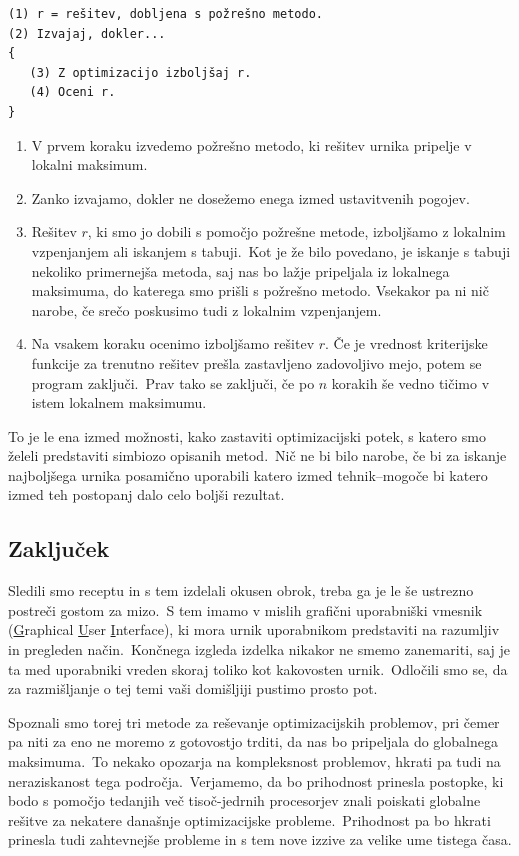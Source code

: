 \documentclass[a4paper,10pt]{article}
\begin{document}
\begin{verbatim}
(1) r = rešitev, dobljena s požrešno metodo.
(2) Izvajaj, dokler...
{
   (3) Z optimizacijo izboljšaj r.
   (4) Oceni r.
}
\end{verbatim}
\begin{enumerate}
   \item V prvem koraku izvedemo požrešno metodo, ki rešitev urnika pripelje v lokalni maksimum.

   \item Zanko izvajamo, dokler ne dosežemo enega izmed ustavitvenih pogojev.

   \item Rešitev \(r\), ki smo jo dobili s pomočjo požrešne metode, izboljšamo z lokalnim vzpenjanjem
   ali iskanjem s tabuji.\ Kot je že bilo povedano, je iskanje s tabuji nekoliko primernejša metoda,
   saj nas bo lažje pripeljala iz lokalnega maksimuma, do katerega smo prišli s požrešno metodo.
   Vsekakor pa ni nič narobe, če srečo poskusimo tudi z lokalnim vzpenjanjem.

   \item Na vsakem koraku ocenimo izboljšamo rešitev \(r\). Če je vrednost kriterijske funkcije
   za trenutno rešitev prešla zastavljeno zadovoljivo mejo, potem se program zaključi.\ Prav tako
   se zaključi, če po \(n\) korakih še vedno tičimo v istem lokalnem maksimumu.
\end{enumerate}   
\noindent To je le ena izmed možnosti, kako zastaviti optimizacijski potek, s katero smo želeli predstaviti
simbiozo opisanih metod.\ Nič ne bi bilo narobe, če bi za iskanje najboljšega urnika posamično
uporabili katero izmed tehnik--mogoče bi katero izmed teh postopanj dalo celo boljši rezultat.

\subsection{Zaključek}

Sledili smo receptu in s tem izdelali \frqq{}okusen obrok\flqq{}, treba ga je le še ustrezno postreči
gostom za mizo.\ S tem imamo v mislih grafični uporabniški vmesnik (\underline{G}raphical \underline{U}ser \underline{I}nterface), ki mora urnik uporabnikom predstaviti na razumljiv in
pregleden način.\ Končnega izgleda izdelka nikakor ne smemo zanemariti, saj je ta med uporabniki
vreden skoraj toliko kot kakovosten urnik.\ Odločili smo se, da za razmišljanje o tej temi vaši
domišljiji pustimo prosto pot.

Spoznali smo torej tri metode za reševanje optimizacijskih problemov, pri čemer pa niti za eno
ne moremo z gotovostjo trditi, da nas bo pripeljala do globalnega maksimuma.\ To nekako opozarja
na kompleksnost problemov, hkrati pa tudi na neraziskanost tega področja.\ Verjamemo, da bo
prihodnost prinesla postopke, ki bodo s pomočjo tedanjih več tisoč-jedrnih procesorjev znali
poiskati globalne rešitve za nekatere današnje optimizacijske probleme.\ Prihodnost pa bo
hkrati prinesla tudi zahtevnejše probleme in s tem nove izzive za velike ume tistega časa.
\end{document}
